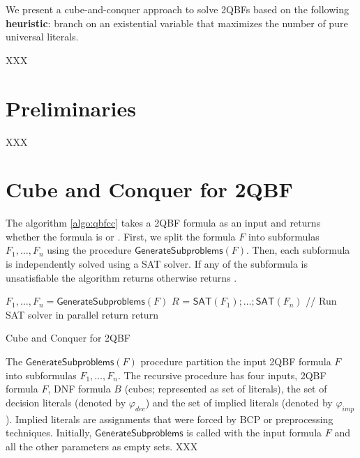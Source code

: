 \documentclass[runningheads]{llncs}
\newcommand{\matrixf}{\phi}
\newcommand{\qp}{\forall X \exists Y}
\newcommand{\FFF}{F}
\newcommand{\BB}{B}
\newcommand{\dec}{\varphi_{dec}}
\newcommand{\imp}{\varphi_{imp}}
\def\preprocess{\mathsf{Preprocess}}
\def\split{\mathsf{GenerateSubproblems}}
\def\sat{\mathsf{SAT}}
\begin{document}
We present a cube-and-conquer approach to solve 2QBFs based on the following \textbf{heuristic}: branch on an existential variable that maximizes the number of pure universal literals.

XXX

\section{Preliminaries} \label{sec:preliminaries}
XXX

\section{Cube and Conquer for 2QBF} \label{sec:cc-qbf}

The algorithm \ref{algo:qbfcc} takes a 2QBF formula as an input and returns whether the formula is \TRUE\space or \FALSE. First, we split the formula $\FFF$ into subformulas $F_1, \dots, F_n$ using the procedure $\split(\FFF)$. Then, each subformula is independently solved using a SAT solver. If any of the subformula is unsatisfiable the algorithm returns \FALSE\space otherwise returns \TRUE.

\begin{algorithm}[]
	\DontPrintSemicolon
	\SetAlgoLined
	\KwData{A 2QBF formula $\FFF = \qp.\matrixf$}
	$F_1,\dots,F_n = \split (\FFF)$ \;
	$R$ = $\sat(F_1); \dots; \sat (F_n)$  // Run SAT solver in parallel \;
	\eIf{ $\exists r \in R$:
		$\sat(r)$ == \FALSE \;
		}
	{ %
		return \FALSE 
	} %
	{ %
	return \TRUE } 
	\caption{Cube and Conquer for 2QBF}
	\label{algo:qbfcc}
\end{algorithm}


The $\split(\FFF)$ procedure partition the input 2QBF formula $\FFF$ into subformulas $F_1, \dots, F_n$. 
The recursive procedure has four inputs, 2QBF formula $\FFF$, DNF formula $\BB$ (cubes; represented as set of literals), the set of decision literals (denoted by $\dec$) and the set of implied literals (denoted by $\imp$). Implied literals are assignments that were forced by BCP or preprocessing techniques. Initially, $\split$ is called with the input formula $\FFF$ and all the other parameters as empty sets. XXX
\end{document}
